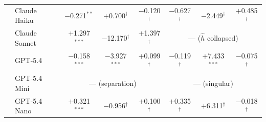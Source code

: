\begin{table}[t]
\begin{tabular}{ll ccc ccc}
\addlinespace
\multirow{5}{*}{GPQA-Diam.}
  & Claude Haiku  & $-$0.271$^{**}$  & $+$0.700$^\dagger$    & $-$0.120$^\dagger$  & $-$0.627$^\dagger$ & $-$2.449$^\dagger$ & $+$0.485$^\dagger$ \\
  & Claude Sonnet & $+$1.297$^{***}$ & $-$12.170$^\dagger$   & $+$1.397$^\dagger$  & \multicolumn{3}{c}{--- \tiny{($\hat h$ collapsed)}} \\
  & GPT-5.4       & $-$0.158$^{***}$ & $-$3.927$^{***}$      & $+$0.099$^\dagger$  & $-$0.119$^\dagger$ & $+$7.433$^{***}$ & $-$0.075$^\dagger$ \\
  & GPT-5.4 Mini  & \multicolumn{3}{c}{--- \tiny{(separation)}}                                & \multicolumn{3}{c}{--- \tiny{(singular)}} \\
  & GPT-5.4 Nano  & $+$0.321$^{***}$ & $-$0.956$^\dagger$    & $+$0.100$^\dagger$  & $+$0.335$^\dagger$ & $+$6.311$^\dagger$ & $-$0.018$^\dagger$ \\
\bottomrule
\end{tabular}
\end{table}
